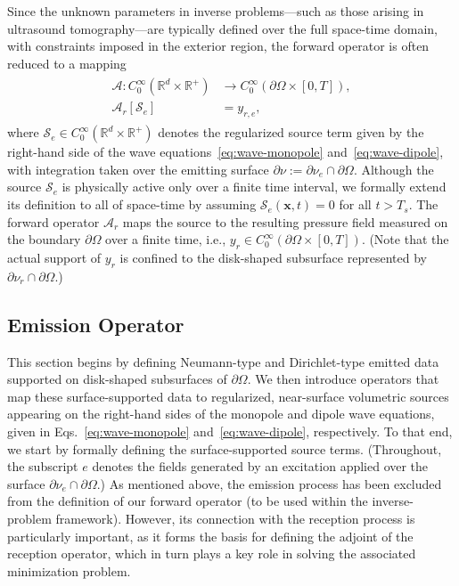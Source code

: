 \documentclass[11pt,reqno]{amsart}
\theoremstyle{remark}
\theoremstyle{italic_lemma}
\newcommand{\bx}{\boldsymbol{x}}
\begin{document}
Since the unknown parameters in inverse problems—such as those arising in ultrasound tomography—are typically defined over the full space-time domain, with constraints imposed in the exterior region, the forward operator is often reduced to a mapping
\begin{align}
    \begin{split}
        \mathcal{A}: C_0^{\infty} \left( \mathbb{R}^d \times \mathbb{R}^+ \right) &\rightarrow C_0^{\infty} \left( \partial \Omega \times [0, T] \right), \\
        \mathcal{A}_r \left[ \mathcal{S}_e \right] &= y_{r,e},
    \end{split}
\end{align}
where \( \mathcal{S}_e \in C_0^{\infty}(\mathbb{R}^d \times \mathbb{R}^+) \) denotes the regularized source term given by the right-hand side of the wave equations~\eqref{eq:wave-monopole} and~\eqref{eq:wave-dipole}, with integration taken over the emitting surface \( \partial \nu := \partial \nu_e \cap \partial \Omega \). Although the source \( \mathcal{S}_e \) is physically active only over a finite time interval, we formally extend its definition to all of space-time by assuming \( \mathcal{S}_e(\bx, t) = 0 \) for all \( t > T_s \). The forward operator \( \mathcal{A}_r \) maps the source to the resulting pressure field measured on the boundary \( \partial \Omega \) over a finite time, i.e., \( y_r \in C_0^{\infty} \left(  \partial \Omega \times [0, T] \right) \). (Note that the actual support of \( y_r \) is confined to the disk-shaped subsurface represented by \( \partial \nu_r \cap \partial \Omega \).)


\subsection{Emission Operator}
This section begins by defining Neumann-type and Dirichlet-type emitted data supported on disk-shaped subsurfaces of \( \partial \Omega \). We then introduce operators that map these surface-supported data to regularized, near-surface volumetric sources appearing on the right-hand sides of the monopole and dipole wave equations, given in Eqs.~\eqref{eq:wave-monopole} and~\eqref{eq:wave-dipole}, respectively. To that end, we start by formally defining the surface-supported source terms.
(Throughout, the subscript \( e \) denotes the fields generated by an excitation applied over the surface \( \partial \nu_e \cap \partial \Omega \).) As mentioned above, the emission process has been excluded from the definition of our forward operator (to be used within the inverse-problem framework). However, its connection with the reception process is particularly important, as it forms the basis for defining the adjoint of the reception operator, which in turn plays a key role in solving the associated minimization problem.
\end{document}
